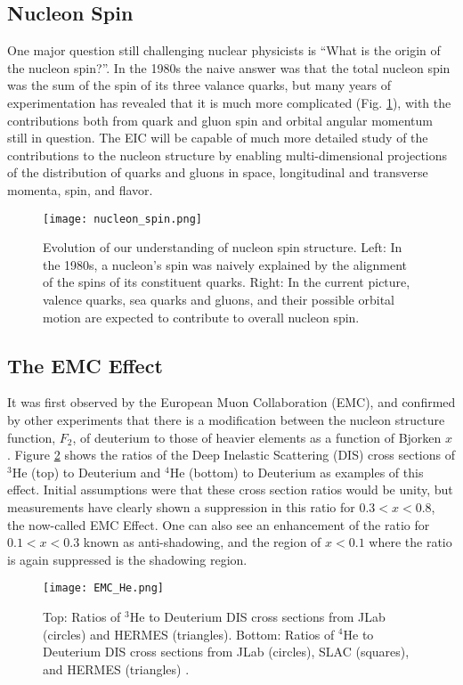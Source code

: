 \subsection{Nucleon Spin}
One major question still challenging nuclear physicists is ``What is the origin of the nucleon spin?''. In the 1980s the naive answer was that the total nucleon spin was the sum of the spin of its three valance quarks, but many years of experimentation has revealed that it is much more complicated (Fig. \ref{fig:nucleon_spin}), with the contributions both from quark and gluon spin and orbital angular momentum still in question. The EIC will be capable of much more detailed study of the contributions to the nucleon structure by enabling multi-dimensional projections of the distribution of quarks and gluons in space, longitudinal and transverse momenta, spin, and flavor.

\begin{figure}[!htb]
	\centering
	\texttt{[image: nucleon\_spin.png]}
	\caption{Evolution of our understanding of nucleon spin structure. Left: In the 1980s, a nucleon’s spin was naively explained by the alignment of the spins of its constituent quarks. Right: In the current picture, valence quarks, sea quarks and gluons, and their possible orbital motion are expected to contribute to overall nucleon spin. \cite{EICWhitePaper}}
	\label{fig:nucleon_spin}
\end{figure}

\subsection{The EMC Effect}
It was first observed by the European Muon Collaboration (EMC), and confirmed by other experiments that there is a modification between the nucleon structure function, $F_2$, of deuterium to those of heavier elements as a function of Bjorken $x$ \cite{SRC_EMC_effect}. Figure \ref{fig:emc_effect} shows the ratios of the Deep Inelastic Scattering (DIS) cross sections of ${}^3$He (top) to Deuterium and ${}^4$He (bottom) to Deuterium as examples of this effect. Initial assumptions were that these cross section ratios would be unity, but measurements have clearly shown a suppression in this ratio for $0.3 < x < 0.8$, the now-called EMC Effect. One can also see an enhancement of the ratio for $0.1 < x < 0.3$ known as anti-shadowing, and the region of $x < 0.1$ where the ratio is again suppressed is the shadowing region.

\begin{figure}[!htb]
	\centering
	\texttt{[image: EMC\_He.png]}
	\caption{Top: Ratios of ${}^3$He to Deuterium DIS cross sections from JLab (circles) and HERMES (triangles). Bottom: Ratios of ${}^4$He to Deuterium DIS cross sections from JLab (circles), SLAC (squares), and HERMES (triangles) \cite{EMC_Challenge}.}
	\label{fig:emc_effect}
\end{figure}


